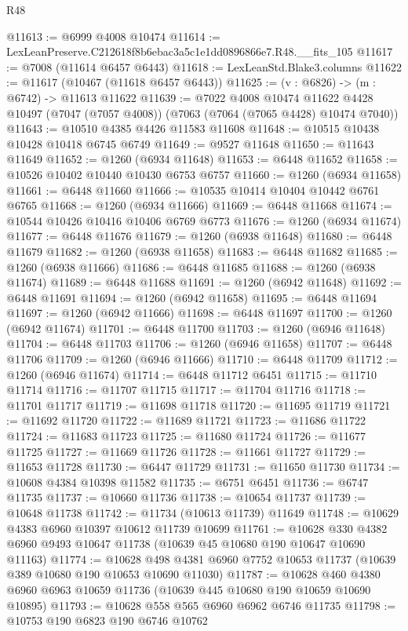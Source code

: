 \begin{lexlean}{R48}
\begin{coremodule}
@11613 := @6999 @4008 @10474
@11614 := LexLeanPreserve.C212618f8b6ebac3a5c1e1dd0896866e7.R48.__fits_105
@11617 := @7008 (@11614 @6457 @6443)
@11618 := LexLeanStd.Blake3.columns
@11622 := @11617 (@10467 (@11618 @6457 @6443))
@11625 := (v : @6826) -> (m : @6742) -> @11613 @11622
@11639 := @7022
    @4008
    @10474
    @11622
    @4428
    @10497
    (@7047 (@7057 @4008))
    (@7063 (@7064 (@7065 @4428) @10474 @7040))
@11643 := @10510 @4385 @4426 @11583 @11608
@11648 := @10515 @10438 @10428 @10418 @6745 @6749
@11649 := @9527 @11648
@11650 := @11643 @11649
@11652 := @1260 (@6934 @11648)
@11653 := @6448 @11652
@11658 := @10526 @10402 @10440 @10430 @6753 @6757
@11660 := @1260 (@6934 @11658)
@11661 := @6448 @11660
@11666 := @10535 @10414 @10404 @10442 @6761 @6765
@11668 := @1260 (@6934 @11666)
@11669 := @6448 @11668
@11674 := @10544 @10426 @10416 @10406 @6769 @6773
@11676 := @1260 (@6934 @11674)
@11677 := @6448 @11676
@11679 := @1260 (@6938 @11648)
@11680 := @6448 @11679
@11682 := @1260 (@6938 @11658)
@11683 := @6448 @11682
@11685 := @1260 (@6938 @11666)
@11686 := @6448 @11685
@11688 := @1260 (@6938 @11674)
@11689 := @6448 @11688
@11691 := @1260 (@6942 @11648)
@11692 := @6448 @11691
@11694 := @1260 (@6942 @11658)
@11695 := @6448 @11694
@11697 := @1260 (@6942 @11666)
@11698 := @6448 @11697
@11700 := @1260 (@6942 @11674)
@11701 := @6448 @11700
@11703 := @1260 (@6946 @11648)
@11704 := @6448 @11703
@11706 := @1260 (@6946 @11658)
@11707 := @6448 @11706
@11709 := @1260 (@6946 @11666)
@11710 := @6448 @11709
@11712 := @1260 (@6946 @11674)
@11714 := @6448 @11712 @6451
@11715 := @11710 @11714
@11716 := @11707 @11715
@11717 := @11704 @11716
@11718 := @11701 @11717
@11719 := @11698 @11718
@11720 := @11695 @11719
@11721 := @11692 @11720
@11722 := @11689 @11721
@11723 := @11686 @11722
@11724 := @11683 @11723
@11725 := @11680 @11724
@11726 := @11677 @11725
@11727 := @11669 @11726
@11728 := @11661 @11727
@11729 := @11653 @11728
@11730 := @6447 @11729
@11731 := @11650 @11730
@11734 := @10608 @4384 @10398 @11582
@11735 := @6751 @6451
@11736 := @6747 @11735
@11737 := @10660 @11736
@11738 := @10654 @11737
@11739 := @10648 @11738
@11742 := @11734 (@10613 @11739) @11649
@11748 := @10629 @4383 @6960 @10397 @10612 @11739 @10699
@11761 := @10628 @330 @4382 @6960 @9493 @10647 @11738 (@10639 @45 @10680 @190 @10647 @10690 @11163)
@11774 := @10628 @498 @4381 @6960 @7752 @10653 @11737 (@10639 @389 @10680 @190 @10653 @10690 @11030)
@11787 := @10628 @460 @4380 @6960 @6963 @10659 @11736 (@10639 @445 @10680 @190 @10659 @10690 @10895)
@11793 := @10628 @558 @565 @6960 @6962 @6746 @11735
@11798 := @10753 @190 @6823 @190 @6746 @10762

\end{coremodule}
\end{lexlean}
